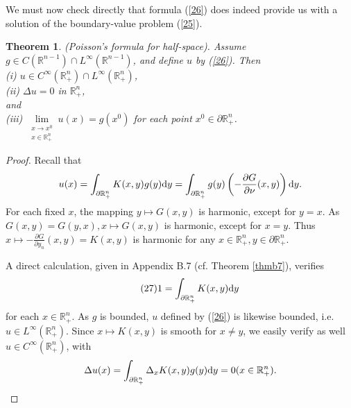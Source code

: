 \documentclass[hyperref,UTF8,12pt]{article}
\numberwithin{equation}{subsection}
\theoremstyle{plain}
\newtheorem{theorem}{Theorem}
\theoremstyle{definition}
\numberwithin{theorem}{section}
\numberwithin{lemma}{section}
\numberwithin{proposition}{section}
\numberwithin{remark}{section}
\numberwithin{corollary}{section}
\numberwithin{definition}{section}
\numberwithin{problem}{section}
\numberwithin{example}{section}
\def\dif{\textup{d}}
\newcommand{\limls}{\lim\limits}
\newcommand{\ptl}{\partial}
\newcommand{\mr}{\mathbb{R}}
\begin{document}
We must now check directly that formula (\ref{26}) does indeed provide us with a solution of the boundary-value problem (\ref{25}).
\begin{theorem}\label{thm2.14}
(Poisson's formula for half-space). Assume $g\in C(\mr^{n-1})\cap L^\infty(\mr^{n-1})$, and define $u$ by \textup{(\ref{26})}. Then\\
\textup{(i)} $u\in C^\infty(\mr_+^n)\cap L^\infty(\mr_+^n)$,\\
\textup{(ii)} $\Delta u=0$ in $\mr_+^n$,\\
and\\
\textup{(iii)} $\limls_{\substack{x\to x^0\\x\in\mr_+^n}}u(x)=g(x^0)$ for each point $x^0\in\ptl\mr_+^n$.
\end{theorem}
\begin{proof}
Recall that\[u(x)=\int_{\ptl\mr_+^n}K(x,y)g(y)\dif y=\int_{\ptl\mr_+^n}g(y) \left(-\frac{\ptl G}{\ptl\nu}(x,y)\right)\dif y.\]
For each fixed $x$, the mapping $y\mapsto G(x,y)$ is harmonic, except for $y=x$. As $G(x,y)=G(y,x),x\mapsto G(x,y)$ is harmonic, except for $x=y$. Thus $x\mapsto-\frac{\ptl G}{\ptl y_n}(x,y)=K(x,y)$ is harmonic for any $x\in\mr_+^n,y\in\ptl\mr_+^n$.

A direct calculation, given in Appendix B.7 (cf. Theorem \ref{thmb7}), verifies \[\tag{27}
1=\int_{\ptl\mr_+^n}K(x,y)\dif y\label{27}\]for each $x\in\mr_+^n$. As $g$ is bounded, $u$ defined by (\ref{26}) is likewise bounded, i.e. $u\in L^\infty(\mr_+^n)$. Since $x\mapsto K(x,y)$ is smooth for $x\neq y$, we easily verify as well $u\in C^\infty(\mr_+^n)$, with
\[\Delta u(x)=\int_{\ptl\mr_+^n}\Delta_xK(x,y)g(y)\dif y=0(x\in\mr_+^n).\]


\end{proof}
\end{document}
